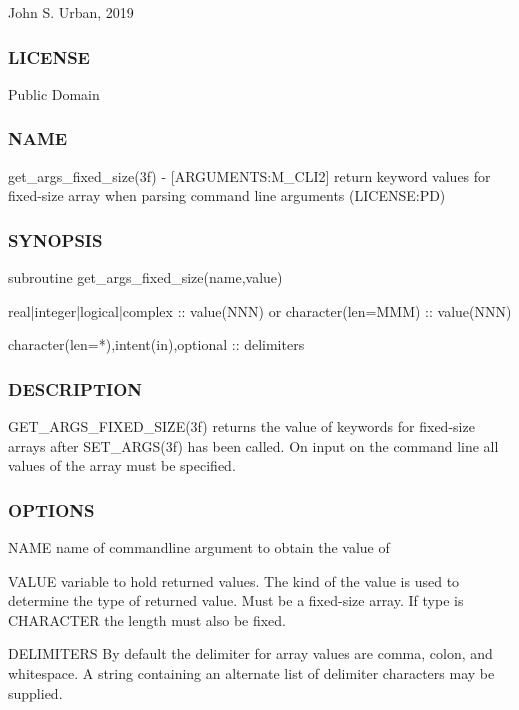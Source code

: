 John S. Urban, 2019 \subsubsection*{L\+I\+C\+E\+N\+SE}

Public Domain \subsubsection*{N\+A\+ME}

get\+\_\+args\+\_\+fixed\+\_\+size(3f) -\/ \mbox{[}A\+R\+G\+U\+M\+E\+N\+TS\+:M\+\_\+\+C\+L\+I2\mbox{]} return keyword values for fixed-\/size array when parsing command line arguments (L\+I\+C\+E\+N\+SE\+:PD)

\subsubsection*{S\+Y\+N\+O\+P\+S\+IS}

\begin{DoxyVerb}subroutine get_args_fixed_size(name,value)

 real|integer|logical|complex :: value(NNN)
    or
 character(len=MMM) :: value(NNN)

 character(len=*),intent(in),optional :: delimiters
\end{DoxyVerb}


\subsubsection*{D\+E\+S\+C\+R\+I\+P\+T\+I\+ON}

\begin{DoxyVerb}GET_ARGS_FIXED_SIZE(3f) returns the value of keywords for
fixed-size arrays after SET_ARGS(3f) has been called.
On input on the command line all values of the array must
be specified.
\end{DoxyVerb}


\subsubsection*{O\+P\+T\+I\+O\+NS}

N\+A\+ME name of commandline argument to obtain the value of

V\+A\+L\+UE variable to hold returned values. The kind of the value is used to determine the type of returned value. Must be a fixed-\/size array. If type is C\+H\+A\+R\+A\+C\+T\+ER the length must also be fixed.

D\+E\+L\+I\+M\+I\+T\+E\+RS By default the delimiter for array values are comma, colon, and whitespace. A string containing an alternate list of delimiter characters may be supplied.

